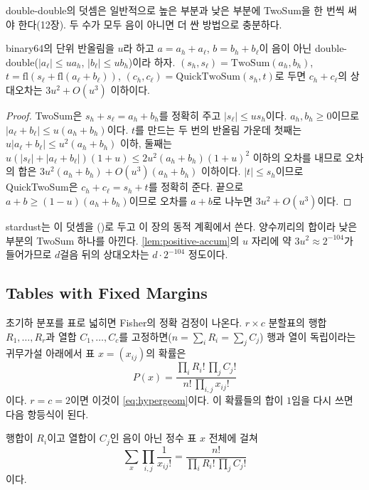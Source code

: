 double-double의 덧셈은 일반적으로 높은 부분과 낮은 부분에 TwoSum을 한 번씩 써야 한다(12장). 두 수가 모두 음이 아니면 더 싼 방법으로 충분하다.

\begin{lemma}
\label{lem:add-pos}
binary64의 단위 반올림을 $u$라 하고 $a=a_h+a_\ell$, $b=b_h+b_\ell$이 음이 아닌 double-double($|a_\ell|\le ua_h$, $|b_\ell|\le ub_h$)이라 하자. $(s_h,s_\ell)=\mathrm{TwoSum}(a_h,b_h)$, $t=\mathrm{fl}(s_\ell+\mathrm{fl}(a_\ell+b_\ell))$, $(c_h,c_\ell)=\mathrm{QuickTwoSum}(s_h,t)$로 두면 $c_h+c_\ell$의 상대오차는 $3u^2+O(u^3)$ 이하이다.
\end{lemma}

\begin{proof}
TwoSum은 $s_h+s_\ell=a_h+b_h$를 정확히 주고 $|s_\ell|\le us_h$이다. $a_h,b_h\ge0$이므로 $|a_\ell+b_\ell|\le u(a_h+b_h)$이다. $t$를 만드는 두 번의 반올림 가운데 첫째는 $u|a_\ell+b_\ell|\le u^2(a_h+b_h)$ 이하, 둘째는 $u(|s_\ell|+|a_\ell+b_\ell|)(1+u)\le2u^2(a_h+b_h)(1+u)^2$ 이하의 오차를 내므로 오차의 합은 $3u^2(a_h+b_h)+O(u^3)(a_h+b_h)$ 이하이다. $|t|\le s_h$이므로 QuickTwoSum은 $c_h+c_\ell=s_h+t$를 정확히 준다. 끝으로 $a+b\ge(1-u)(a_h+b_h)$이므로 오차를 $a+b$로 나누면 $3u^2+O(u^3)$이다.
\end{proof}

stardust는 이 덧셈을 ()로 두고 이 장의 동적 계획에서 쓴다. 양수끼리의 합이라 낮은 부분의 TwoSum 하나를 아낀다. \cref{lem:positive-accum}의 $u$ 자리에 약 $3u^2\approx2^{-104}$가 들어가므로 $d$걸음 뒤의 상대오차는 $d\cdot2^{-104}$ 정도이다.

\subsection{Tables with Fixed Margins}

초기하 분포를 표로 넓히면 Fisher의 정확 검정이 나온다. $r\times c$ 분할표의 행합 $R_1,\dots,R_r$과 열합 $C_1,\dots,C_c$를 고정하면($n=\sum_iR_i=\sum_jC_j$) 행과 열이 독립이라는 귀무가설 아래에서 표 $x=(x_{ij})$의 확률은
\[
P(x)=\frac{\prod_iR_i!\,\prod_jC_j!}{n!\,\prod_{i,j}x_{ij}!}
\]
이다. $r=c=2$이면 이것이 \cref{eq:hypergeom}이다. 이 확률들의 합이 $1$임을 다시 쓰면 다음 항등식이 된다.

\begin{proposition}
\label{prop:multinomial-vandermonde}
행합이 $R_i$이고 열합이 $C_j$인 음이 아닌 정수 표 $x$ 전체에 걸쳐
\[
\sum_x\prod_{i,j}\frac1{x_{ij}!}=\frac{n!}{\prod_iR_i!\,\prod_jC_j!}
\]
이다.
\end{proposition}

